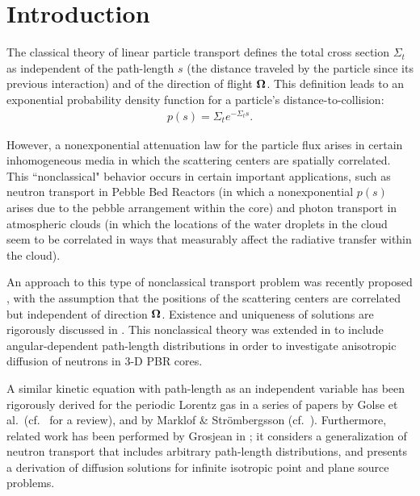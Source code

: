 \documentclass[12pt]{article}
\newcommand{\uomega}{{\bf \Omega}}
\begin{document}
\pagebreak

\doublespacing

\section{Introduction}

The classical theory of linear particle transport defines the total cross section $\Sigma_t$ as independent of the path-length $s$ (the distance traveled by the particle since its previous interaction) and of the direction of flight $\uomega$.
This definition leads to an exponential probability density function for a particle's distance-to-collision:
\begin{align}\label{eq1}
p(s) = \Sigma_t e^{-\Sigma_t s}.
\end{align}

However, a nonexponential attenuation law for the particle flux arises in certain inhomogeneous media in which the scattering centers are spatially correlated.
This ``nonclassical" behavior occurs in certain important applications, such as neutron transport in Pebble Bed Reactors (in which a nonexponential $p(s)$ arises due to the pebble arrangement within the core) and photon transport in atmospheric clouds (in which the locations of the water droplets in the cloud seem to be correlated in ways that measurably affect the radiative transfer within the cloud).

An approach to this type of nonclassical transport problem was recently proposed \cite{lar07,larvas11}, with the assumption that the positions of the scattering
centers are correlated but independent of direction $\uomega$.
Existence and uniqueness of solutions are rigorously discussed in \cite{fra10}.
This nonclassical theory was extended in \cite{vaslar14a} to include angular-dependent path-length distributions in order to investigate anisotropic diffusion of neutrons in 3-D PBR cores.

A similar kinetic equation with path-length as an independent variable has been rigorously derived for the periodic Lorentz gas in a series of papers by Golse et al.~(cf.~\cite{gol12} for a review), and by Marklof \& Str\"ombergsson (cf.~\cite{mar11,mar15}).
Furthermore, related work has been performed by Grosjean in \cite{gro51}; it considers a generalization of neutron transport that includes arbitrary path-length distributions, and presents a derivation of diffusion solutions for infinite isotropic point and plane source problems.
 
\end{document}
